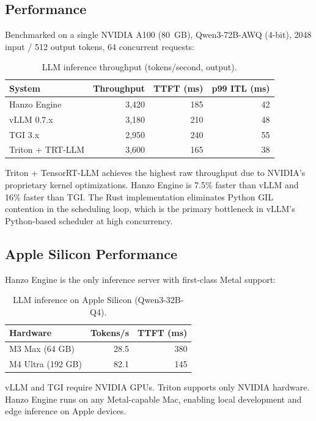\subsection{Performance}

Benchmarked on a single NVIDIA A100 (80~GB), Qwen3-72B-AWQ (4-bit), 2048 input / 512 output tokens, 64 concurrent requests:

\begin{table}[H]
\centering
\caption{LLM inference throughput (tokens/second, output).}
\footnotesize
\begin{tabular}{@{}lrrr@{}}
\toprule
System & Throughput & TTFT (ms) & p99 ITL (ms) \\
\midrule
Hanzo Engine & 3,420 & 185 & 42 \\
vLLM 0.7.x & 3,180 & 210 & 48 \\
TGI 3.x & 2,950 & 240 & 55 \\
Triton + TRT-LLM & 3,600 & 165 & 38 \\
\bottomrule
\end{tabular}
\end{table}

Triton + TensorRT-LLM achieves the highest raw throughput due to NVIDIA's proprietary kernel optimizations. Hanzo Engine is 7.5\% faster than vLLM and 16\% faster than TGI. The Rust implementation eliminates Python GIL contention in the scheduling loop, which is the primary bottleneck in vLLM's Python-based scheduler at high concurrency.

\subsection{Apple Silicon Performance}

Hanzo Engine is the only inference server with first-class Metal support:

\begin{table}[H]
\centering
\caption{LLM inference on Apple Silicon (Qwen3-32B-Q4).}
\footnotesize
\begin{tabular}{@{}lrr@{}}
\toprule
Hardware & Tokens/s & TTFT (ms) \\
\midrule
M3 Max (64 GB) & 28.5 & 380 \\
M4 Ultra (192 GB) & 82.1 & 145 \\
\bottomrule
\end{tabular}
\end{table}

vLLM and TGI require NVIDIA GPUs. Triton supports only NVIDIA hardware. Hanzo Engine runs on any Metal-capable Mac, enabling local development and edge inference on Apple devices.


